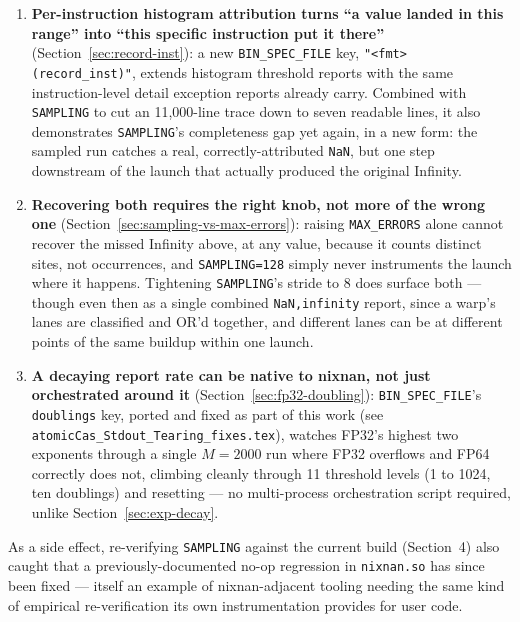 \documentclass[11pt]{article}
\begin{document}
\begin{enumerate}
  \texttt{FP64\_LONGRUN} build mode), FP64 overflows at the step its own growth rate
  predicts, and nixnan attributes it to the identical Laplacian statement and
  $\infty-\infty\to\texttt{NaN}$ mechanism already confirmed for FP32.
\item \textbf{Per-instruction histogram attribution turns ``a value landed in this
  range'' into ``this specific instruction put it there''} (Section~\ref{sec:record-inst}):
  a new \texttt{BIN\_SPEC\_FILE} key, \texttt{"<fmt> (record\_inst)"}, extends histogram
  threshold reports with the same instruction-level detail exception reports already
  carry. Combined with \texttt{SAMPLING} to cut an 11{,}000-line trace down to seven
  readable lines, it also demonstrates \texttt{SAMPLING}'s completeness gap yet again,
  in a new form: the sampled run catches a real, correctly-attributed \texttt{NaN}, but
  one step downstream of the launch that actually produced the original Infinity.
\item \textbf{Recovering both requires the right knob, not more of the wrong one}
  (Section~\ref{sec:sampling-vs-max-errors}): raising \texttt{MAX\_ERRORS} alone cannot
  recover the missed Infinity above, at any value, because it counts distinct sites, not
  occurrences, and \texttt{SAMPLING=128} simply never instruments the launch where it
  happens. Tightening \texttt{SAMPLING}'s stride to 8 does surface both --- though even
  then as a single combined \texttt{NaN,infinity} report, since a warp's lanes are
  classified and OR'd together, and different lanes can be at different points of the
  same buildup within one launch.
\item \textbf{A decaying report rate can be native to nixnan, not just orchestrated
  around it} (Section~\ref{sec:fp32-doubling}): \texttt{BIN\_SPEC\_FILE}'s
  \texttt{doublings} key, ported and fixed as part of this work (see
  \texttt{atomicCas\_Stdout\_Tearing\_fixes.tex}), watches FP32's highest two exponents
  through a single $M{=}2000$ run where FP32 overflows and FP64 correctly does not,
  climbing cleanly through 11 threshold levels (1 to 1024, ten doublings) and resetting
  --- no multi-process orchestration script required, unlike Section~\ref{sec:exp-decay}.
\end{enumerate}
As a side effect, re-verifying \texttt{SAMPLING} against the current build (Section~4)
also caught that a previously-documented no-op regression in \texttt{nixnan.so} has
since been fixed --- itself an example of nixnan-adjacent tooling needing the same kind
of empirical re-verification its own instrumentation provides for user code.
\end{document}
